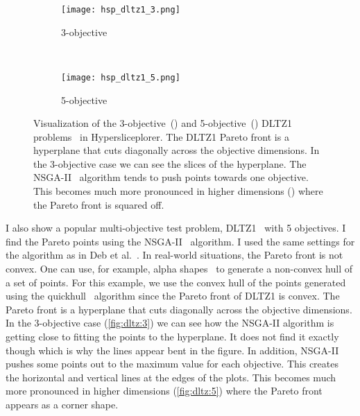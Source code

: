 \begin{figure} 
  \centering
  \begin{subfigure}[b]{0.45\linewidth}
    \texttt{[image: hsp\_dltz1\_3.png]}
    \caption{3-objective}
    \label{fig:dltz:3}
  \end{subfigure}
  ~
  \begin{subfigure}[b]{0.45\linewidth}
    \texttt{[image: hsp\_dltz1\_5.png]}
    \caption{5-objective}
    \label{fig:dltz:5}
  \end{subfigure}
  \caption{%
    Visualization of the 3-objective~() and 
    5-objective~() DLTZ1 problems~\cite{Deb:2002a} in
    Hypersliceplorer. The DLTZ1 Pareto front is a hyperplane that cuts 
    diagonally across the objective dimensions. In the 3-objective case we 
    can see the slices of the hyperplane. The NSGA-II~\cite{Deb:2002} 
    algorithm tends to push points towards one objective. This becomes much
    more pronounced in higher dimensions () where the
    Pareto front is squared off.
  }
  \label{fig:dltz} 
\end{figure}

I also show a popular multi-objective test problem, DLTZ1~\cite{Deb:2002a}
with 5 objectives.  I find the Pareto points using the NSGA-II~\cite{Deb:2002}
algorithm.  I used the same settings for the algorithm as in Deb et 
al.~\cite{Deb:2002a}. In real-world situations, the Pareto front is not
convex. One can use, for example, alpha shapes~\cite{Edelsbrunner:1983} to
generate a non-convex hull of a set of points. For this example, we use the
convex hull of the points generated using the quickhull~\cite{Barber:1996}
algorithm since the Pareto front of DLTZ1 is convex.  The Pareto front is a
hyperplane that cuts diagonally across the objective dimensions. In the
3-objective case (\autoref{fig:dltz:3}) we can see how the NSGA-II algorithm is 
getting close to fitting the points to the hyperplane. It does not find it
exactly though which is why the lines appear bent in the figure. In addition,
NSGA-II pushes some points out to the maximum value for each objective.
This creates the horizontal and vertical lines at the edges of the plots.
This becomes much more pronounced in higher dimensions (\autoref{fig:dltz:5})
where the Pareto front appears as a corner shape.

